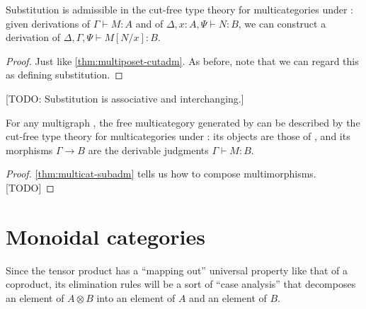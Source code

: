 \documentclass{book}
\makeatletter
\let\types\vdash
\def\type{\;\ftype}
\def\ttt{\mathsf{tt}}
\def\pair#1#2{\langle #1,#2\rangle}
\def\one{\mathbf{1}}
\def\discard#1in{\mathsf{discard}\; #1 \; \mathsf{in} \;}
\let\tensor\otimes
\def\tensorI{\mathord{\tensor}I}
\def\tensorE{\mathord{\tensor}E}
\def\flet#1:{\mathsf{let}\;#1 \@ifnextchar:\@fletdoublecolon\@fletsinglecolon}
\def\@fletdoublecolon:=#1in{\Coloneqq #1\;\mathsf{in}\;}
\def\@fletsinglecolon=#1in{\coloneqq #1\;\mathsf{in}\;}
\makeatother
\begin{document}
\begin{thm}\label{thm:multicat-subadm}
  Substitution is admissible in the cut-free type theory for multicategories under \cG: given derivations of $\Gamma\types M:A$ and of $\Delta,x:A,\Psi\types N:B$, we can construct a derivation of $\Delta,\Gamma,\Psi\types M[N/x]:B$.
\end{thm}
\begin{proof}
  Just like \cref{thm:multiposet-cutadm}.
  As before, note that we can regard this as defining substitution.
\end{proof}

[TODO: Substitution is associative and interchanging.]

\begin{thm}\label{thm:multicat-initial}
  For any multigraph \cG, the free multicategory generated by \cG can be described by the cut-free type theory for multicategories under \cG: its objects are those of \cG, and its morphisms $\Gamma\to B$ are the derivable judgments $\Gamma\types M:B$.
\end{thm}
\begin{proof}
  \cref{thm:multicat-subadm} tells us how to compose multimorphisms.
  [TODO]
\end{proof}


\section{Monoidal categories}
\label{sec:moncat}

Since the tensor product has a ``mapping out'' universal property like that of a coproduct, its elimination rules will be a sort of ``case analysis'' that decomposes an element of $A\tensor B$ into an element of $A$ and an element of $B$.

\end{document}
